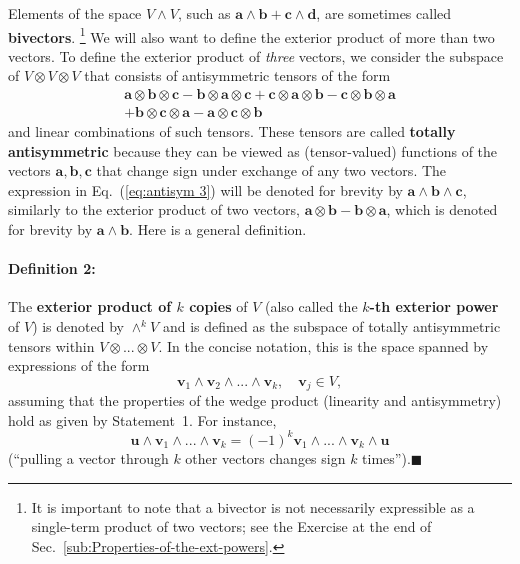 Elements of the space $V\wedge V$, such as $\mathbf{a}\wedge\mathbf{b}+\mathbf{c}\wedge\mathbf{d}$,
are sometimes called \textbf{bivectors}.%
\footnote{It is important to note that a bivector is not necessarily expressible
as a single-term product of two vectors; see the Exercise at the end
of Sec.~\ref{sub:Properties-of-the-ext-powers}.%
} We will also want to define the exterior product of more than two
vectors. To define the exterior product of \emph{three} vectors, we
consider the subspace of $V\otimes V\otimes V$ that consists of antisymmetric
tensors of the form\begin{align}
\mathbf{a}\otimes\mathbf{b}\otimes\mathbf{c}-\mathbf{b}\otimes\mathbf{a}\otimes\mathbf{c}+\mathbf{c}\otimes\mathbf{a}\otimes\mathbf{b}-\mathbf{c}\otimes\mathbf{b}\otimes\mathbf{a}\nonumber \\
+\mathbf{b}\otimes\mathbf{c}\otimes\mathbf{a}-\mathbf{a}\otimes\mathbf{c}\otimes\mathbf{b}\label{eq:antisym 3}\end{align}
and linear combinations of such tensors. These tensors are called
\textbf{totally antisymmetric} because
they can be viewed as (tensor-valued) functions of the vectors $\mathbf{a},\mathbf{b},\mathbf{c}$
that change sign under exchange of any two vectors. The expression
in Eq.~(\ref{eq:antisym 3}) will be denoted for brevity by $\mathbf{a}\wedge\mathbf{b}\wedge\mathbf{c}$,
similarly to the exterior product of two vectors, $\mathbf{a}\otimes\mathbf{b}-\mathbf{b}\otimes\mathbf{a}$,
which is denoted for brevity by $\mathbf{a}\wedge\mathbf{b}$. Here
is a general definition.


\paragraph{Definition 2:}

The \textbf{exterior product of $k$ copies}
of $V$ (also called the \textbf{$k$-th exterior power} of $V$)
is denoted by $\wedge^{k}V$ and is defined as the subspace of totally
antisymmetric tensors within $V\otimes...\otimes V$. In the concise
notation, this is the space spanned by expressions of the form\[
\mathbf{v}_{1}\wedge\mathbf{v}_{2}\wedge...\wedge\mathbf{v}_{k},\quad\mathbf{v}_{j}\in V,\]
assuming that the properties of the wedge product (linearity and antisymmetry)
hold as given by Statement~1. For instance, \begin{equation}
\mathbf{u}\wedge\mathbf{v}_{1}\wedge...\wedge\mathbf{v}_{k}=\left(-1\right)^{k}\mathbf{v}_{1}\wedge...\wedge\mathbf{v}_{k}\wedge\mathbf{u}\label{eq:uv pull}\end{equation}
({}``pulling a vector through $k$ other vectors changes sign $k$
times'').\hfill{}$\blacksquare$

